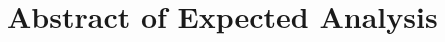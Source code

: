\documentclass[11pt]{article}
\begin{document}
\section{Abstract of Expected Analysis}




\nocite{texTemp}
\nocite{BibTex}
\nocite{BibMang}
\nocite{bibStyle}


\end{document}
